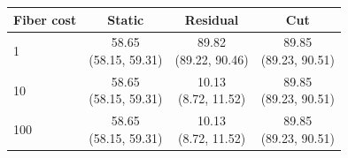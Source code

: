 \begin{tabular}{@{}lccc@{}}
\toprule
Fiber cost & Static & Residual & Cut\\
\midrule
1 & \shortstack{58.65\\(58.15, 59.31)} & \shortstack{89.82\\(89.22, 90.46)} & \shortstack{89.85\\(89.23, 90.51)}\\[3pt]
10 & \shortstack{58.65\\(58.15, 59.31)} & \shortstack{10.13\\(8.72, 11.52)} & \shortstack{89.85\\(89.23, 90.51)}\\[3pt]
100 & \shortstack{58.65\\(58.15, 59.31)} & \shortstack{10.13\\(8.72, 11.52)} & \shortstack{89.85\\(89.23, 90.51)}\\[3pt]
\bottomrule
\end{tabular}
